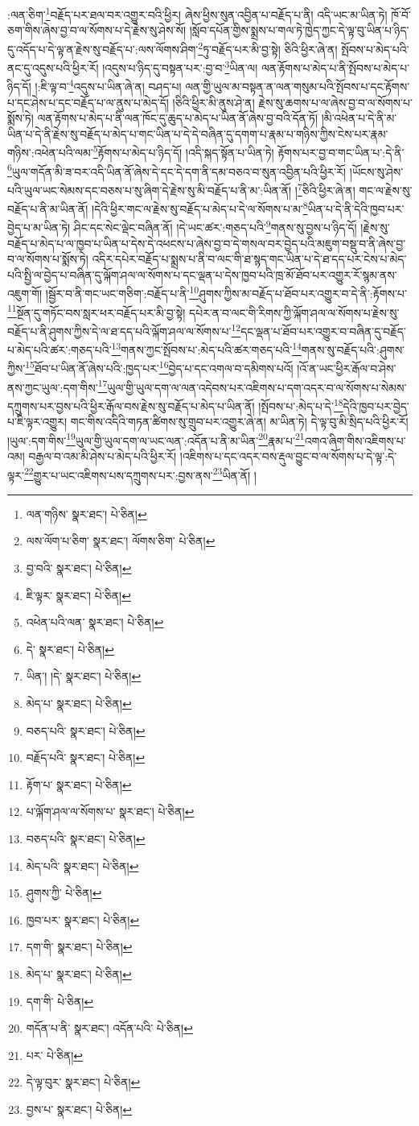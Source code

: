:ལན་ཅིག་\footnote{ལན་གཉིས་  སྣར་ཐང་།  པེ་ཅིན། }བརྗོད་པར་ཐལ་བར་འགྱུར་བའི་ཕྱིར། ཞེས་ཕྱིས་སུན་འབྱིན་པ་བརྗོད་པ་ནི། འདི་ཡང་མ་ཡིན་ཏེ། ཁོ་བོ་ཅག་གིས་ཞེས་བྱ་བ་ལ་སོགས་པ་དེ་རྗེས་སུ་ཤེས་སོ། །སློབ་དཔོན་གྱིས་སྨྲས་པ་གལ་ཏེ་ཁྱེད་ཀྱང་དེ་ལྟ་བུ་ཡིན་པ་ཉིད་དུ་འདོད་པ་དེ་ལྟ་ན་རྗེས་སུ་བརྗོད་པ་:ལས་ལོགས་ཤིག་\footnote{ལས་ལོག་པ་ཅིག་  སྣར་ཐང་། ལོགས་ཅིག་  པེ་ཅིན། }ཏུ་བརྗོད་པར་མི་བྱ་སྟེ། ཅིའི་ཕྱིར་ཞེ་ན། སྤོབས་པ་མེད་པའི་ནང་དུ་འདུས་པའི་ཕྱིར་རོ། །འདུས་པ་ཉིད་དུ་བསྟན་པར་:བྱ་བ་\footnote{བྱ་བའི་  སྣར་ཐང་།  པེ་ཅིན། }ཡིན་ལ། ལན་རྟོགས་པ་མེད་པ་ནི་སྤོབས་པ་མེད་པ་ཉིད་དོ། །:ཇི་ལྟ་བ་\footnote{ཇི་ལྟར་  སྣར་ཐང་།  པེ་ཅིན། }འདུས་པ་ཡིན་ཞེ་ན། བཤད་པ། ལན་གྱི་ཡུལ་མ་བསྟན་ན་ལན་གསུམ་པའི་སྤོབས་པ་དང་རྟོགས་པ་དང་ཤེས་པ་དང་བརྗོད་པ་ལ་ནུས་པ་མེད་དོ། །ཅིའི་ཕྱིར་མི་ནུས་ཤེ་ན། རྗེས་སུ་ཆགས་པ་ལ་ཞེས་བྱ་བ་ལ་སོགས་པ་སྨོས་ཏེ། ལན་རྟོགས་པ་མེད་པ་ནི་ལན་ཁོང་དུ་ཆུད་པ་མེད་པ་ཡིན་ནོ་ཞེས་བྱ་བའི་དོན་ཏོ། །མི་འཕེན་པ་དེ་ནི་མ་ཡིན་པ་དེ་ནི་རྗེས་སུ་བརྗོད་པ་མེད་པ་གང་ཡིན་པ་དེ་དེ་བཞིན་དུ་དགག་པ་རྣམ་པ་གཉིས་ཀྱིས་ངེས་པར་རྣམ་གཉིས་:འཕེན་པའི་ལམ་\footnote{འཕེན་པའི་ལན་  སྣར་ཐང་།  པེ་ཅིན། }རྟོགས་པ་མེད་པ་ཉིད་དོ། །འདི་སྐད་སྟོན་པ་ཡིན་ཏེ། རྟོགས་པར་བྱ་བ་གང་ཡིན་པ་:དེ་ནི་\footnote{དེ་  སྣར་ཐང་།  པེ་ཅིན། }ཡུལ་གདོན་མི་ཟ་བར་འདི་ཡིན་ནོ་ཞེས་དེ་དང་དེ་དག་ནི་དམ་བཅའ་བ་སུན་འབྱིན་པའི་ཕྱིར་རོ། །ཡོངས་སུ་ཤེས་པའི་ཡུལ་ཡང་སེམས་དང་བཅས་པ་སུ་ཞིག་དེ་རྗེས་སུ་མི་བརྗོད་པ་ནི་མ་:ཡིན་ནོ། །\footnote{ཡིན་། །དེ་  སྣར་ཐང་།  པེ་ཅིན། }ཅིའི་ཕྱིར་ཞེ་ན། གང་ལ་རྗེས་སུ་བརྗོད་པ་ནི་མ་ཡིན་ནོ། །དེའི་ཕྱིར་གང་ལ་རྗེས་སུ་བརྗོད་པ་མེད་པ་དེ་ལ་སོགས་པ་མ་\footnote{མེད་པ་  སྣར་ཐང་།  པེ་ཅིན། }ཡིན་པ་དེ་ནི་དེའི་ཁྱབ་པར་བྱེད་པ་མ་ཡིན་ཏེ། ཤིང་དང་སེང་ལྡེང་བཞིན་ནོ། །དེ་ཡང་ཚར་:གཅད་པའི་\footnote{བཅད་པའི་  སྣར་ཐང་།  པེ་ཅིན། }གནས་སུ་བྱས་པ་ཉིད་དོ། །རྗེས་སུ་བརྗོད་པ་མེད་པ་ལ་ཁྱབ་པ་ཡིན་པ་དེས་དེ་འཕངས་པ་ཞེས་བྱ་བ་དེ་གསལ་བར་བྱེད་པའི་མཇུག་བསྡུ་བ་ནི་ཞེས་བྱ་བ་ལ་སོགས་པ་སྨོས་ཏེ། འདིར་དཔེར་བརྗོད་པ་སྨྲས་པ་ནི་བ་ལང་གི་ཐ་སྙད་གང་ཡིན་པ་དེ་ཐ་དད་པར་ངེས་པ་མེད་པའི་སྤྱི་ལ་བྱེད་པ་བཞིན་དུ་ལྐོག་ཤལ་ལ་སོགས་པ་དང་ལྡན་པ་དེས་ཁྱབ་པའི་ཁྲ་མོ་ཐོབ་པར་འགྱུར་རོ་སྙམ་ནས་འཇུག་གོ། །སྦྱོར་བ་ནི་གང་ཡང་གཅིག་:བརྗོད་པ་ནི་\footnote{བརྗོད་པའི་  སྣར་ཐང་།  པེ་ཅིན། }ཤུགས་ཀྱིས་མ་བརྗོད་པ་ཐོབ་པར་འགྱུར་བ་དེ་ནི་:རྟོགས་པ་\footnote{རྟོག་པ་  སྣར་ཐང་།  པེ་ཅིན། }སྔོན་དུ་གཏོང་བས་སླར་ཕར་བརྗོད་པར་མི་བྱ་སྟེ། དཔེར་ན་བ་ལང་གི་རིགས་ཀྱི་ལྐོག་ཤལ་ལ་སོགས་པ་རྗེས་སུ་བརྗོད་པ་ནི་ཤུགས་ཀྱིས་དེ་ལ་ཐ་དད་པའི་ལྐོག་ཤལ་ལ་སོགས་པ་\footnote{པ་ལྐོག་ཤལ་ལ་སོགས་པ་  སྣར་ཐང་།  པེ་ཅིན། }དང་ལྡན་པ་ཐོབ་པར་འགྱུར་བ་བཞིན་དུ་བརྗོད་པ་མེད་པའི་ཚར་:གཅད་པའི་\footnote{བཅད་པའི་  སྣར་ཐང་།  པེ་ཅིན། }གནས་ཀྱང་སྤོབས་པ་:མེད་པའི་ཚར་གཅད་པའི་\footnote{མེད་པའི་  སྣར་ཐང་།  པེ་ཅིན། }གནས་སུ་བརྗོད་པའི་:ཤུགས་ཀྱིས་\footnote{ཤུགས་ཀྱི་  པེ་ཅིན། }ཐོབ་པ་ཡིན་ནོ་ཞེས་པའི་:ཁྱད་པར་\footnote{ཁྱབ་པར་  སྣར་ཐང་།  པེ་ཅིན། }བྱེད་པ་དང་འགལ་བ་དམིགས་པའོ། །འོ་ན་ཡང་ཕྱིར་རྒོལ་བ་ཤེས་ནས་ཀྱང་ཡུལ་:དག་གིས་\footnote{དག་གི་  སྣར་ཐང་།  པེ་ཅིན། }ཡུལ་གྱི་ཡུལ་དག་ལ་ལན་འདེབས་པར་འཇིགས་པ་དག་འདར་བ་ལ་སོགས་པ་སེམས་དཀྲུགས་པར་བྱས་པའི་ཕྱིར་རྒོལ་བས་རྗེས་སུ་བརྗོད་པ་མེད་པ་ཡིན་ནོ། །སྤོབས་པ་:མེད་པ་དེ་\footnote{མེད་པ་  སྣར་ཐང་།  པེ་ཅིན། }དེའི་ཁྱབ་པར་བྱེད་པ་ཇི་ལྟར་འགྱུར། གང་གིས་འདིའི་གཏན་ཚིགས་སུ་གྲུབ་པར་འགྱུར་ཞེ་ན། མ་ཡིན་ཏེ། དེ་ལྟ་བུ་མི་སྲིད་པའི་ཕྱིར་རོ། །ཡུལ་:དག་གིས་\footnote{དག་གི་  པེ་ཅིན། }ཡུལ་གྱི་ཡུལ་དག་ལ་ཡང་ལན་:འདོན་པ་ནི་མ་ཡིན་\footnote{གདོན་པ་ནི་  སྣར་ཐང་། འདོན་པའི་  པེ་ཅིན། }རྣམ་པ་\footnote{པར་  པེ་ཅིན། }འགའ་ཞིག་གིས་འཇིགས་པ་འམ། བརྒྱལ་བ་འམ་མི་ཤེས་པ་མེད་པའི་ཕྱིར་རོ། །འཇིགས་པ་དང་འདར་བས་རྡུལ་བྱུང་བ་ལ་སོགས་པ་དེ་ལྟ་:དེ་ལྟར་\footnote{དེ་ལྟ་བུར་  སྣར་ཐང་།  པེ་ཅིན། }གྱུར་པ་ཡང་འཇིགས་པས་དཀྲུགས་པར་:བྱས་ནས་\footnote{བྱས་པ་  སྣར་ཐང་།  པེ་ཅིན། }ཡིན་ནོ། །
